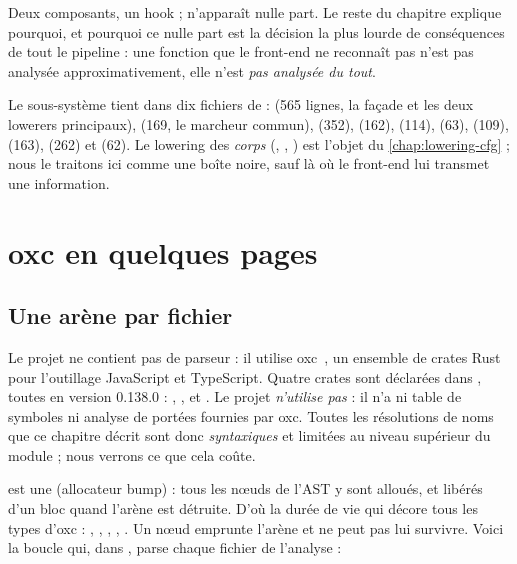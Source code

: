 Deux composants, un hook ;  n'apparaît nulle part. Le reste du chapitre explique pourquoi, et pourquoi ce \og nulle part\fg{} est la décision la plus lourde de conséquences de tout le pipeline : une fonction que le front-end ne reconnaît pas n'est pas analysée approximativement, elle n'est \emph{pas analysée du tout}.

Le sous-système tient dans dix fichiers de  :  (565 lignes, la façade et les deux lowerers principaux),  (169, le marcheur commun),  (352),  (162),  (114),  (63),  (109),  (163),  (262) et  (62). Le lowering des \emph{corps} (, , ) est l'objet du \cref{chap:lowering-cfg} ; nous le traitons ici comme une boîte noire, sauf là où le front-end lui transmet une information.

\section{oxc en quelques pages}
\label{sec:frontend-oxc}

\subsection{Une arène par fichier}

Le projet ne contient pas de parseur : il utilise oxc~\cite{oxc}, un ensemble de crates Rust pour l'outillage JavaScript et TypeScript. Quatre crates sont déclarées dans , toutes en version 0.138.0 : , ,  et . Le projet \emph{n'utilise pas}  : il n'a ni table de symboles ni analyse de portées fournies par oxc. Toutes les résolutions de noms que ce chapitre décrit sont donc \emph{syntaxiques} et limitées au niveau supérieur du module ; nous verrons ce que cela coûte.

 est une  (allocateur \og bump\fg{}) : tous les nœuds de l'AST y sont alloués, et libérés d'un bloc quand l'arène est détruite. D'où la durée de vie  qui décore tous les types d'oxc : , , , , . Un nœud emprunte l'arène et ne peut pas lui survivre. Voici la boucle qui, dans , parse chaque fichier de l'analyse :

